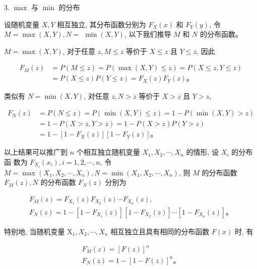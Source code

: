\documentclass{beamer}
\begin{document}
	\begin{frame}
		3. $\max$ 与 $\min$ 的分布
		
		设随机变量 $X, Y$ 相互独立, 其分布函数分别为 $F_{X}(x)$ 和 $F_{Y}(y)$, 令 $M=\max (X, Y), N=$ $\min (X, Y)$, 以下我们推导 $M$ 和 $N$ 的分布函数。
		
		$M=\max (X, Y)$, 对于任意 $z, M \leqslant z$ 等价于 $X \leqslant z$ 且 $Y \leqslant z$, 因此
		
		$$
		\begin{aligned}
			F_{M}(z) & =P(M \leqslant z)=P(\max (X, Y) \leqslant z)=P(X \leqslant z, Y \leqslant z) \\
			& =P(X \leqslant z) P(Y \leqslant z)=F_{X}(z) F_{Y}(z) 。
		\end{aligned}
		$$
		
		类似有 $N=\min (X, Y)$, 对任意 $z, N>z$ 等价于 $X>z$ 且 $Y>z$,
		
		$$
		\begin{aligned}
			F_{N}(z) & =P(N \leqslant z)=P(\min (X, Y) \leqslant z)=1-P(\min (X, Y)>z) \\
			& =1-P(X>z, Y>z)=1-P(X>z) P(Y>z) \\
			& =1-\left[1-F_{X}(z)\right]\left[1-F_{Y}(z)\right] 。
		\end{aligned}
		$$
	\end{frame}
	
	\begin{frame}
		以上结果可以推广到 $n$ 个相互独立随机变量 $X_{1}, X_{2}, \cdots, X_{n}$ 的情形, 设 $X_{i}$ 的分布函 数为 $F_{X_{i}}\left(x_{i}\right), i=1,2, \cdots, n$, 令 $M=\max \left(X_{1}, X_{2}, \cdots, X_{n}\right), N=\min \left(X_{1}, X_{2}, \cdots, X_{n}\right)$, 则 $M$ 的分布函数 $F_{M}(z), N$ 的分布函数 $F_{N}(z)$ 分别为
		
		$$
		\begin{gathered}
			F_{M}(z)=F_{X_{1}}(z) F_{X_{2}}(z) \cdots F_{X_{n}}(z), \\
			F_{N}(z)=1-\left[1-F_{X_{1}}(z)\right]\left[1-F_{X_{2}}(z)\right] \cdots\left[1-F_{X_{n}}(z)\right] 。
		\end{gathered}
		$$
		
		特别地, 当随机变量 $\mathrm{X}_{1}, X_{2}, \cdots, X_{n}$ 相互独立且具有相同的分布函数 $F(x)$ 时, 有
		
		$$
		\begin{gathered}
			F_{M}(z)=[F(z)]^{n} \\
			F_{N}(z)=1-[1-F(z)]^{n} 。
		\end{gathered}
		$$
	\end{frame}
	
\end{document}
